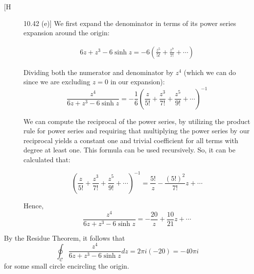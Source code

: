 \documentclass[12pt]{article}%
\newcommand{\C}{\mathcal{C}}
\begin{document}
\begin{description}
  \item[[H] 10.42 (e)]
  We first expand the denominator in terms of its power series expansion around the origin:

  \begin{align*}
      6z + z^3 - 6 \sinh{z} = -6\left(\frac{z^5}{5!} + \frac{z^7}{7!} + \cdots \right)
  \end{align*}

  Dividing both the numerator and denominator by $z^4$ (which we can do since we are excluding $z = 0$ in our expansion):
  \[\frac{z^4}{6z + z^3 - 6\sinh{z}} = -\frac{1}{6}\left(\frac{z}{5!} + \frac{z^3}{7!} + \frac{z^5}{9!} + \cdots \right)^{-1}\]

  We can compute the reciprocal of the power series, by utilizing the product rule for power series and requiring that multiplying the power series by our reciprocal yields a constant one and trivial coefficient for all terms with degree at least one. This formula can be used recursively. So, it can be calculated that:

  \[\left(\frac{z}{5!} + \frac{z^3}{7!} + \frac{z^5}{9!} + \cdots \right)^{-1} = \frac{5!}{z} - \frac{(5!)^2}{7!}z + \cdots \]

  Hence,
  \[\frac{z^4}{6z + z^3 - 6\sinh{z}} = - \frac{20}{z} + \frac{10}{21}z + \cdots \]
\end{description}

By the Residue Theorem, it follows that \[ \oint_{\C}\frac{z^4}{6z + z^3 - 6\sinh{z}} dz = 2\pi i (-20) = -40\pi i\]
for some small circle encircling the origin.
\end{document}
